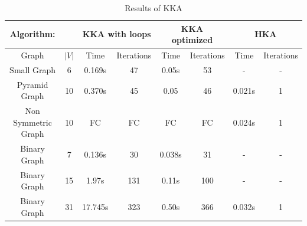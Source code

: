 \documentclass[12pt,a4paper]{article}
\begin{document}
\begin{table}

\begin{tabular}{|c|c||c|c|c|c|c|c|}
\hline
Algorithm: & & \multicolumn{2}{|c|}{ KKA with loops} &\multicolumn{2}{|c|}{KKA optimized} &  \multicolumn{2}{|c|}{HKA}  \\
\hline
\hline 
Graph & $|V|$ & Time & Iterations & Time & Iterations & Time & Iterations\\ 
\hline
Small Graph & 6 & 0.169s & 47& 0.05s & 53 &- & - \\ 
\hline 
Pyramid Graph & 10 & 0.370s & 45& 0.05& 46 &0.021s & 1  \\ 
\hline 
Non Symmetric Graph & 10 & FC  &FC & FC& FC & 0.024s & 1\\ 
\hline 
Binary Graph & 7 & 0.136s & 30 & 0.038s& 31 & -&-\\ 
\hline 
Binary Graph & 15 & 1.97s & 131 & 0.11s& 100 & -& - \\ 
\hline 
Binary Graph & 31 & 17.745s & 323& 0.50s & 366 & 0.032s & 1 \\ 
\hline 
\end{tabular} 
\caption[Results of KKA]{Results of KKA}
\label{table: small}
\end{table}

\FloatBarrier 
\end{document}
